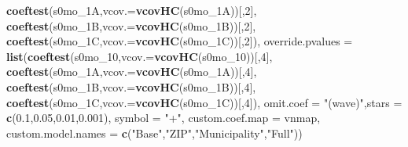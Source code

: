 \documentclass[
]{article}
\newenvironment{Shaded}{\begin{snugshade}}{\end{snugshade}}
\newcommand{\DataTypeTok}[1]{\textcolor[rgb]{0.13,0.29,0.53}{#1}}
\newcommand{\DecValTok}[1]{\textcolor[rgb]{0.00,0.00,0.81}{#1}}
\newcommand{\FloatTok}[1]{\textcolor[rgb]{0.00,0.00,0.81}{#1}}
\newcommand{\KeywordTok}[1]{\textcolor[rgb]{0.13,0.29,0.53}{\textbf{#1}}}
\newcommand{\NormalTok}[1]{#1}
\newcommand{\StringTok}[1]{\textcolor[rgb]{0.31,0.60,0.02}{#1}}
\begin{document}
\begin{Shaded}
\begin{Highlighting}[]
                             \KeywordTok{coeftest}\NormalTok{(s0mo_1A,}\DataTypeTok{vcov.=}\KeywordTok{vcovHC}\NormalTok{(s0mo_1A))[,}\DecValTok{2}\NormalTok{],}
                             \KeywordTok{coeftest}\NormalTok{(s0mo_1B,}\DataTypeTok{vcov.=}\KeywordTok{vcovHC}\NormalTok{(s0mo_1B))[,}\DecValTok{2}\NormalTok{],}
                             \KeywordTok{coeftest}\NormalTok{(s0mo_1C,}\DataTypeTok{vcov.=}\KeywordTok{vcovHC}\NormalTok{(s0mo_1C))[,}\DecValTok{2}\NormalTok{]),}
          \DataTypeTok{override.pvalues =} \KeywordTok{list}\NormalTok{(}\KeywordTok{coeftest}\NormalTok{(s0mo_}\DecValTok{10}\NormalTok{,}\DataTypeTok{vcov.=}\KeywordTok{vcovHC}\NormalTok{(s0mo_}\DecValTok{10}\NormalTok{))[,}\DecValTok{4}\NormalTok{],}
                                  \KeywordTok{coeftest}\NormalTok{(s0mo_1A,}\DataTypeTok{vcov.=}\KeywordTok{vcovHC}\NormalTok{(s0mo_1A))[,}\DecValTok{4}\NormalTok{],}
                                  \KeywordTok{coeftest}\NormalTok{(s0mo_1B,}\DataTypeTok{vcov.=}\KeywordTok{vcovHC}\NormalTok{(s0mo_1B))[,}\DecValTok{4}\NormalTok{],}
                                  \KeywordTok{coeftest}\NormalTok{(s0mo_1C,}\DataTypeTok{vcov.=}\KeywordTok{vcovHC}\NormalTok{(s0mo_1C))[,}\DecValTok{4}\NormalTok{]),}
          \DataTypeTok{omit.coef =} \StringTok{"(wave)"}\NormalTok{,}\DataTypeTok{stars =} \KeywordTok{c}\NormalTok{(}\FloatTok{0.1}\NormalTok{,}\FloatTok{0.05}\NormalTok{,}\FloatTok{0.01}\NormalTok{,}\FloatTok{0.001}\NormalTok{), }\DataTypeTok{symbol =} \StringTok{"+"}\NormalTok{,}
          \DataTypeTok{custom.coef.map =}\NormalTok{ vnmap, }
          \DataTypeTok{custom.model.names =} \KeywordTok{c}\NormalTok{(}\StringTok{"Base"}\NormalTok{,}\StringTok{"ZIP"}\NormalTok{,}\StringTok{"Municipality"}\NormalTok{,}\StringTok{"Full"}\NormalTok{))}
\end{Highlighting}
\end{Shaded}
\end{document}
